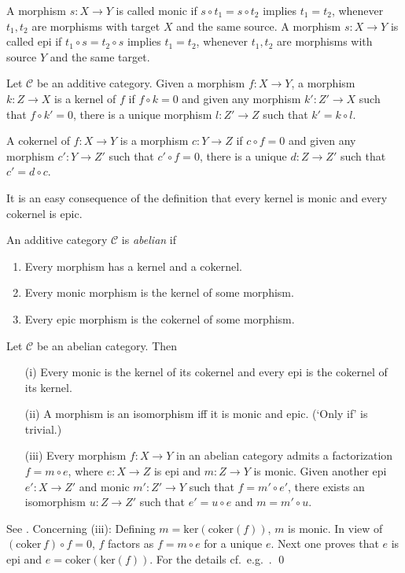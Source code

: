 \documentclass[12pt]{article}
\theoremstyle{definition}
\theoremstyle{definition}
\theoremstyle{remark}
\def\2#1{{\mathcal #1}}
\newcommand{\rarr}{\rightarrow}
\begin{document}
\bdefin {}
A morphism $s:X\rarr Y$ is called monic if $s\circ t_1=s\circ t_2$ implies $t_1=t_2$, whenever
$t_1,t_2$ are morphisms with target $X$ and the same source.
A morphism $s:X\rarr Y$ is called epi if $t_1\circ s=t_2\circ s$ implies $t_1=t_2$, whenever
$t_1,t_2$ are morphisms with source $Y$ and the same target.
\edefin

\bdefin {}
Let $\2C$ be an additive category. Given a morphism $f:X\rarr Y$, a morphism $k: Z\rarr X$ is a
kernel of $f$ if $f\circ k=0$ and given any morphism $k': Z'\rarr X$ such that $f\circ k'=0$, there
is a unique morphism $l:Z'\rarr Z$ such that $k'=k\circ l$.

A cokernel  of $f:X\rarr Y$ is a morphism $c: Y\rarr Z$ if $c\circ f=0$ and given any morphism 
$c': Y\rarr Z'$ such that $c'\circ f=0$, there is a unique $d: Z\rarr Z'$ such that $c'=d\circ c$.
\edefin

It is an easy consequence of the definition that every kernel is monic and every cokernel is epic.

\bdefin \label{def-abelian} 
An additive category $\2C$ is \emph{abelian} if
\begin{enumerate}
\item Every morphism has a kernel and a cokernel.
\item Every monic morphism is the kernel of some morphism.
\item Every epic morphism is the cokernel of some morphism.
\end{enumerate}
\edefin

\bprop \label{prop-me} Let $\2C$ be an abelian category. Then
\begin{itemize}
\item[(i)] Every monic is the kernel of its cokernel and every epi is the cokernel of its kernel.
\item[(ii)] A morphism is an isomorphism iff it is monic and epic. (`Only if' is trivial.)
\item[(iii)] Every morphism $f:X\rarr Y$ in an abelian category admits a factorization $f=m\circ e$,
where  $e:X\rarr Z$ is epi and  $m:Z\rarr Y$ is monic. Given another epi $e':X\rarr Z'$ and monic
$m':Z'\rarr Y$ such that $f=m'\circ e'$, there exists an isomorphism $u:Z\rarr Z'$ such that
$e'=u\circ e$ and $m=m'\circ u$.  
\end{itemize}
\eprop

\prf See \cite[Chapter VIII]{cwm}. Concerning (iii): Defining $m=\mathrm{ker}(\mathrm{coker}(f))$,
$m$ is monic. In view of $(\mathrm{coker}\,f)\circ f=0$, $f$ factors as $f=m\circ e$ for a unique
$e$. Next one proves that $e$ is epi and $e=\mathrm{coker}(\mathrm{ker}(f))$. For the details cf.\
e.g.\ \cite{cwm}. \qed 
\end{document}
